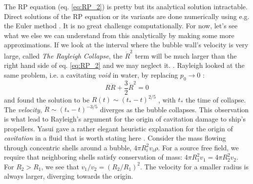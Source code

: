 \documentclass[rmp,aps,nofootinbib,superscriptaddress,floatfix]{revtex4-2}
\begin{document}
The RP equation (eq. \ref{eq:RP_2}) is pretty but its analytical solution intractable. Direct solutions of the RP equation or its variants are done numerically using e.g. the Euler method \cite{yasui2018acoustic,yasui2015dynamics}. It is no great challenge computationally. For now, let's see what we else we can understand from this analytically by making some more approximations. If we look at the interval where the bubble wall's velocity is very large, called \emph{The Rayleigh Collapse}, the $\dot{R}^2$ term will be much larger than the right hand side of eq. \ref{eq:RP_2} and we may neglect it. \cite{rayleigh1917pressure,plesset1949dynamics,prosperetti1999old,brenner2002single}. Rayleigh looked at the same problem, i.e. a cavitating \emph{void} in water, by replacing $p_0\rightarrow 0$ \cite{brenner2002single,rayleigh1917pressure}:
\begin{equation}
    R\ddot{R}+\frac{3}{2}\dot{R}^2=0
    \label{eq:Rayleigh}
\end{equation}
and found the solution to be $R(t)\sim\left(t_*-t\right)^{2/5}$ \cite{brenner2002single}, with $t_*$ the time of collapse. The \emph{velocity}, $\dot{R}\sim\left(t_*-t \right)^{-3/5}$ diverges as the bubble collapses. This observation is what lead to Rayleigh's argument for the origin of cavitation damage to ship's propellers. Yasui gave a rather elegant heuristic explanation for the origin of \emph{cavitation} in a fluid that is worth stating here \cite{yasui2018acoustic}. Consider the mass flowing through concentric shells around a bubble, $4\pi R_i^2 v_i \rho$. For a source free field, we require that neighboring shells satisfy conservation of mass: $4\pi R_1^2 v_1 = 4\pi R_2^2 v_2$. For $R_2 > R_1$, we see that $v_1/v_2 = \left(R_2/R_1\right)^2$. The velocity for a smaller radius is always larger, diverging towards the origin.
\end{document}
